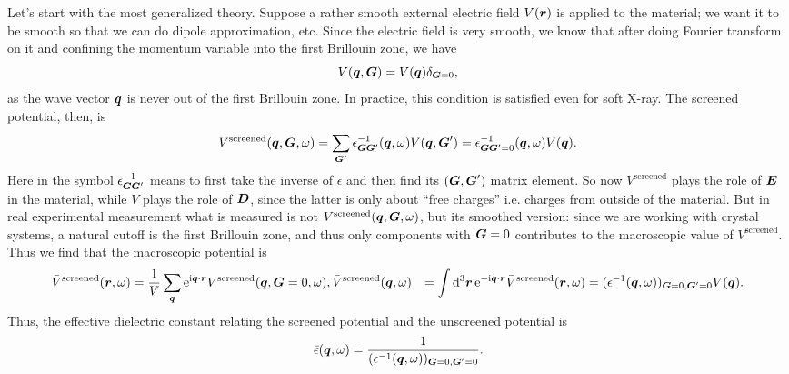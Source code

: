 \documentclass[hyperref, a4paper, 12pt]{report}
\newcommand*{\ii}{\mathrm{i}}
\newcommand*{\ee}{\mathrm{e}}
\def\\{}%
\begin{document}
Let's start with the most generalized theory.
Suppose a rather smooth external electric field $V(\vb*{r})$ is applied to the material;
we want it to be smooth so that we can do dipole approximation, etc.
Since the electric field is very smooth, 
we know that after doing Fourier transform on it 
and confining the momentum variable into the first Brillouin zone, 
we have 
\begin{equation}
    V(\vb*{q}, \vb*{G}) = V(\vb*{q}) \delta_{\vb*{G} = 0},
\end{equation}
as the wave vector $\vb*{q}$ 
is never out of the first Brillouin zone. 
In practice, this condition is satisfied even for soft X-ray. 
The screened potential, then, is 
\begin{equation}
    V^{\text{screened}}(\vb*{q}, \vb*{G}, \omega) = 
    \sum_{\vb*{G}'} \epsilon^{-1}_{\vb*{G} \vb*{G}'} (\vb*{q}, \omega) 
    V(\vb*{q}, \vb*{G}')
    = \epsilon^{-1}_{\vb*{G} \vb*{G}' = 0} (\vb*{q}, \omega) 
    V(\vb*{q}).
\end{equation}
Here in the symbol $\epsilon^{-1}_{\vb*{G} \vb*{G}'}$
means to first take the inverse of $\epsilon$
and then find its $(\vb*{G}, \vb*{G}')$ matrix element.
So now $V^{\text{screened}}$ plays the role of $\vb*{E}$ in the material,
while $V$ plays the role of $\vb*{D}$,
since the latter is only about ``free charges''
i.e. charges from outside of the material.
But in real experimental measurement what is measured is not $V^{\text{screened}}(\vb*{q}, \vb*{G}, \omega)$,
but its smoothed version:
since we are working with crystal systems, 
a natural cutoff is the first Brillouin zone, 
and thus only components with $\vb*{G} = 0$ contributes 
to the macroscopic value of $V^{\text{screened}}$.
Thus we find that the macroscopic potential is  
\begin{equation}
    \begin{aligned}
        \bar{V}^{\text{screened}}(\vb*{r}, \omega) &= \frac{1}{V} \sum_{\vb*{q}} \ee^{\ii \vb*{q} \cdot \vb*{r}}
        V^{\text{screened}} (\vb*{q}, \vb*{G} = 0, \omega) , \\
        \bar{V}^{\text{screened}}(\vb*{q}, \omega)
        &= \int \dd[3]{\vb*{r}} \ee^{- \ii \vb*{q} \cdot \vb*{r}} \bar{V}^{\text{screened}}(\vb*{r}, \omega)
        = (\epsilon^{-1}(\vb*{q}, \omega))_{\vb*{G} = 0, \vb*{G}' = 0} V(\vb*{q}).
    \end{aligned}
\end{equation}
Thus, the effective dielectric constant relating 
the screened potential and the unscreened potential is 
\begin{equation}
    \bar{\epsilon}(\vb*{q}, \omega) = \frac{1}{
        (\epsilon^{-1}(\vb*{q}, \omega))_{\vb*{G} = 0, \vb*{G}' = 0}
    }.
    \label{eq:macroscopic-dielectric}
\end{equation}
\end{document}
